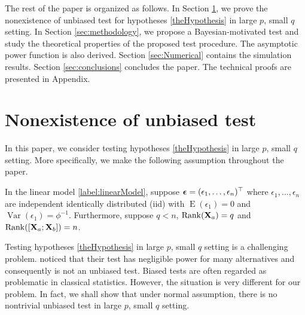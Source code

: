 \documentclass[smallextended]{svjour3}       %
\DeclareMathOperator{\myRank}{Rank}
\DeclareMathOperator{\myE}{E}
\DeclareMathOperator{\myVar}{Var}
\begin{document}
The rest of the paper is organized as follows.
In Section \ref{sec:unbiased}, we prove the nonexistence of unbiased test for hypotheses \eqref{theHypothesis} in large $p$, small $q$ setting.
In Section \ref{sec:methodology}, we propose a Bayesian-motivated test and study the theoretical properties of the proposed test procedure.
The asymptotic power function is also derived.
Section \ref{sec:Numerical} contains the simulation results. 
Section \ref{sec:conclusions} concludes the paper.
The technical proofs are presented in Appendix.


\section{Nonexistence of unbiased test}\label{sec:unbiased}

In this paper, we consider testing hypotheses \eqref{theHypothesis} in large $p$, small $q$ setting.
More specifically, we make the following assumption throughout the paper.
\begin{assumption}
    In the linear model \eqref{label:linearModel}, 
    suppose $\boldsymbol{\epsilon}=(\epsilon_1,\ldots,\epsilon_n)^\top$ where $\epsilon_1,\ldots, \epsilon_n$ are independent identically distributed (iid) with $\myE (\epsilon_1) = 0$ and $\myVar (\epsilon_1) = \phi^{-1}$.
    Furthermore, suppose $q<n$, $\myRank(\BX_a)=q$ and $\myRank([\BX_a; \BX_b])=n$.
    \label{Assumption}
\end{assumption}
Testing hypotheses \eqref{theHypothesis} in large $p$, small $q$ setting is a challenging problem.
\cite{Goeman2006} noticed that their test has negligible power for many alternatives and consequently is not an unbiased test.
Biased tests are often regarded as problematic in classical statistics.
However, the situation is very different for our problem.
In fact, we shall show that under normal assumption, there is no nontrivial unbiased test in large $p$, small $q$ setting.
\end{document}
